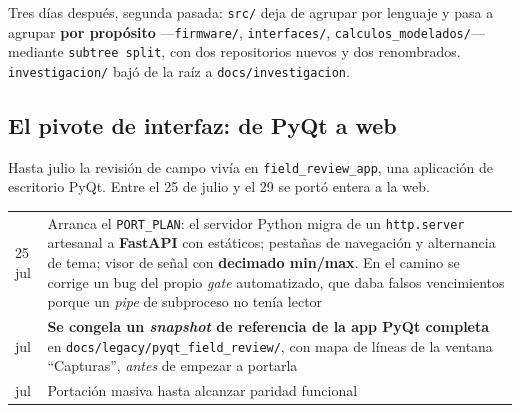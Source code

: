 Tres d\'ias despu\'es, segunda pasada: \texttt{src/} deja de agrupar por lenguaje
y pasa a agrupar \textbf{por prop\'osito}
---\texttt{firmware/}, \texttt{interfaces/}, \texttt{calculos\_modelados/}---
mediante \texttt{subtree split}, con dos repositorios nuevos y dos renombrados.
\texttt{investigacion/} baj\'o de la ra\'iz a \texttt{docs/investigacion}.



\subsection{El pivote de interfaz: de PyQt a web}

Hasta julio la revisi\'on de campo viv\'ia en \texttt{field\_review\_app}, una
aplicaci\'on de escritorio PyQt. Entre el 25 de julio y el 29 se port\'o
entera a la web.

\begin{center}\small
\begin{tabularx}{\textwidth}{@{}l X@{}}
\toprule
25 jul & Arranca el \texttt{PORT\_PLAN}: el servidor Python migra de un \texttt{http.server} artesanal a \textbf{FastAPI} con est\'aticos; pesta\~nas de navegaci\'on y alternancia de tema; visor de se\~nal con \textbf{decimado min/max}. En el camino se corrige un bug del propio \emph{gate} automatizado, que daba falsos vencimientos porque un \emph{pipe} de subproceso no ten\'ia lector \\
\addlinespace[2pt]
26 jul & \textbf{Se congela un \emph{snapshot} de referencia de la app PyQt completa} en \texttt{docs/legacy/pyqt\_field\_review/}, con mapa de l\'ineas de la ventana ``Capturas'', \emph{antes} de empezar a portarla \\
\addlinespace[2pt]
29 jul & Portaci\'on masiva hasta alcanzar paridad funcional \\
\bottomrule
\end{tabularx}
\end{center}


